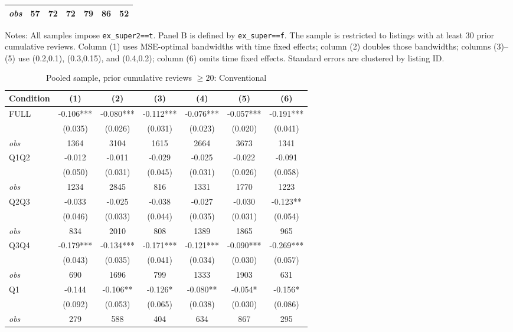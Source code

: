 \begin{table}[!htbp]
\begin{tabular}{lcccccc}
\textit{obs} & 57 & 72 & 72 & 79 & 86 & 52 \\
\bottomrule
\end{tabular}
\begin{minipage}{0.98\textwidth}\footnotesize
Notes: All samples impose \texttt{ex\_super2==t}. Panel B is defined by \texttt{ex\_super==f}. The sample is restricted to listings with at least 30 prior cumulative reviews. Column (1) uses MSE-optimal bandwidths with time fixed effects; column (2) doubles those bandwidths; columns (3)--(5) use (0.2,0.1), (0.3,0.15), and (0.4,0.2); column (6) omits time fixed effects. Standard errors are clustered by listing ID.
\end{minipage}
\end{table}

\begin{table}[!htbp]
\centering
\caption{Pooled sample, prior cumulative reviews $\geq20$: Conventional}
\begin{tabular}{lcccccc}
\toprule
Condition & (1) & (2) & (3) & (4) & (5) & (6) \\
\midrule
FULL & -0.106*** & -0.080*** & -0.112*** & -0.076*** & -0.057*** & -0.191*** \\
 & (0.035) & (0.026) & (0.031) & (0.023) & (0.020) & (0.041) \\
\textit{obs} & 1364 & 3104 & 1615 & 2664 & 3673 & 1341 \\
Q1Q2 & -0.012 & -0.011 & -0.029 & -0.025 & -0.022 & -0.091 \\
 & (0.050) & (0.031) & (0.045) & (0.031) & (0.026) & (0.058) \\
\textit{obs} & 1234 & 2845 & 816 & 1331 & 1770 & 1223 \\
Q2Q3 & -0.033 & -0.025 & -0.038 & -0.027 & -0.030 & -0.123** \\
 & (0.046) & (0.033) & (0.044) & (0.035) & (0.031) & (0.054) \\
\textit{obs} & 834 & 2010 & 808 & 1389 & 1865 & 965 \\
Q3Q4 & -0.179*** & -0.134*** & -0.171*** & -0.121*** & -0.090*** & -0.269*** \\
 & (0.043) & (0.035) & (0.041) & (0.034) & (0.030) & (0.057) \\
\textit{obs} & 690 & 1696 & 799 & 1333 & 1903 & 631 \\
Q1 & -0.144 & -0.106** & -0.126* & -0.080** & -0.054* & -0.156* \\
 & (0.092) & (0.053) & (0.065) & (0.038) & (0.030) & (0.086) \\
\textit{obs} & 279 & 588 & 404 & 634 & 867 & 295 \\

\end{tabular}
\end{table}
